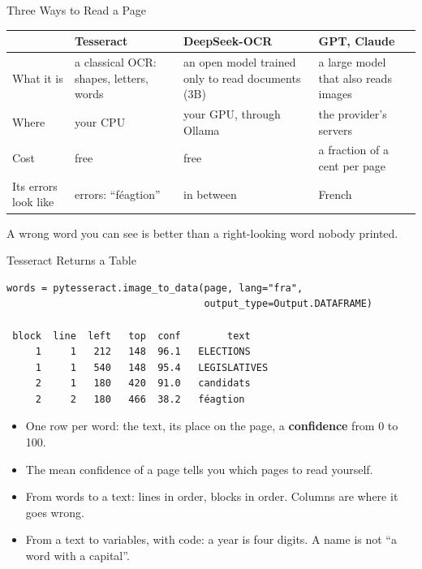\documentclass[svgnames,x11names,dvipsnames]{beamer}
\newcommand{\new}[1]{#1}
\begin{document}
\begin{frame}{\new{Three Ways to Read a Page}}
\footnotesize
\renewcommand{\arraystretch}{1.5}
\begin{tabular}{@{}>{\raggedright\arraybackslash}p{1.9cm}>{\raggedright\arraybackslash}p{2.7cm}>{\raggedright\arraybackslash}p{2.7cm}>{\raggedright\arraybackslash}p{2.7cm}@{}}
\toprule
& \textbf{Tesseract} & \textbf{DeepSeek-OCR} & \textbf{GPT, Claude} \\
\midrule
What it is & a classical OCR: shapes, letters, words & an open model trained only to read documents (3B) & a large model that also reads images \\
Where & your CPU & your GPU, through Ollama & the provider's servers \\
Cost & free & free & a fraction of a cent per page \\
Its errors look like & errors: ``f\'eagtion'' & in between & French \\
\bottomrule
\end{tabular}

\vspace{0.5cm}
\centering
\small
\alert{A wrong word you can see is better than a right-looking word nobody printed.}
\end{frame}

\begin{frame}[fragile]{\new{Tesseract Returns a Table}}
\vspace{0.1cm}
{\scriptsize
\begin{verbatim}
words = pytesseract.image_to_data(page, lang="fra",
                                  output_type=Output.DATAFRAME)

 block  line  left   top  conf        text
     1     1   212   148  96.1   ELECTIONS
     1     1   540   148  95.4   LEGISLATIVES
     2     1   180   420  91.0   candidats
     2     2   180   466  38.2   féagtion
\end{verbatim}}

\vspace{0.3cm}
\small
\begin{itemize}
    \setlength{\itemsep}{4pt}
    \item One row per word: the text, its place on the page, a \textbf{confidence} from 0 to 100.
    \item The mean confidence of a page tells you which pages to read yourself.
    \item From words to a text: lines in order, blocks in order. Columns are where it goes wrong.
    \item From a text to variables, with code: a year is four digits. A name is not ``a word with a capital''.
\end{itemize}
\end{frame}
\end{document}

